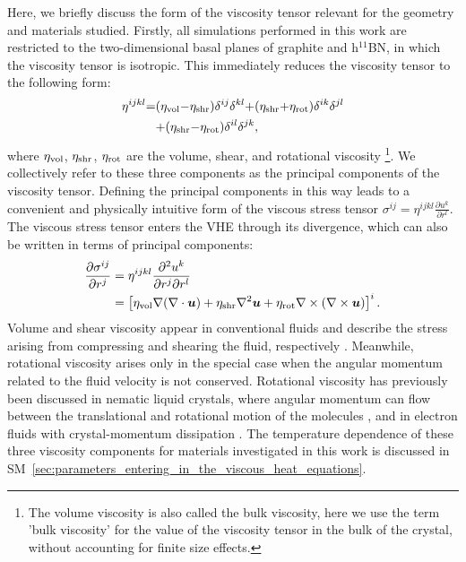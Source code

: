 \documentclass[
prb,
twocolumn,
superscriptaddress,
 amsmath,amssymb,
 aps,
longbibliography,
]{revtex4-2}
\begin{document}
Here, we briefly discuss the form of the viscosity tensor relevant for the geometry and materials studied. Firstly, all simulations performed in this work are restricted to the two-dimensional basal planes of graphite and h$^{11}$BN, in which the viscosity tensor is isotropic. This immediately reduces the viscosity tensor to the following form:
\begin{equation}
  \begin{split}
        \eta^{ijkl} {=}& (\eta_{\rm vol} {-} \eta_{\rm shr})\delta^{ij}\delta^{kl} {+} (\eta_{\rm shr} {+} \eta_{\rm rot})\delta^{ik}\delta^{jl} \\&{+} (\eta_{\rm shr} {-} \eta_{\rm rot})\delta^{il}\delta^{jk},
  \end{split}
\label{eq:visc_decomposition}
\end{equation}
where $\eta_{\rm vol}$, $\eta_{\rm shr}$, $\eta_{\rm rot}$ are the volume, shear, and rotational viscosity \footnote{The volume viscosity is also called the bulk viscosity, here we use the term 'bulk viscosity' for the value of the viscosity tensor in the bulk of the crystal, without accounting for finite size effects.}. We collectively refer to these three components as the principal components of the viscosity tensor.
Defining the principal components in this way leads to a convenient and physically intuitive form of the viscous stress tensor $\sigma^{ij} = \eta^{ijkl} \tfrac{\partial u^k}{\partial r^l}$. The viscous stress tensor enters the VHE through its divergence, which can also be written in terms of principal components:
\begin{equation}
\begin{split}
\frac{\partial \sigma^{ij}}{\partial r^j} &=
\eta^{ijkl} \frac{\partial^2 u^k}{\partial r^j \partial r^l} \\
&= \left[\eta_{\rm vol} \nabla (\nabla\cdot\bm{u}) + \eta_{\rm shr} \nabla^2 \bm{u} + \eta_{\rm rot} \nabla \times (\nabla \times \bm{u})\right]^i.
\end{split}
\raisetag{13mm}
\end{equation}
Volume and shear viscosity appear in conventional fluids and describe the stress arising from compressing and shearing the fluid, respectively \cite{landau_fluid}. Meanwhile, rotational viscosity arises only in the special case when the angular momentum related to the fluid velocity is not conserved. Rotational viscosity has previously been discussed in nematic liquid crystals, where angular momentum can flow between the translational and rotational motion of the molecules \cite{groot_thermodynamics}, and in electron fluids with crystal-momentum dissipation \cite{el_rot_viscosity}. The temperature dependence of these three viscosity components for materials investigated in this work is discussed in SM~\ref{sec:parameters_entering_in_the_viscous_heat_equations}.
\end{document}
